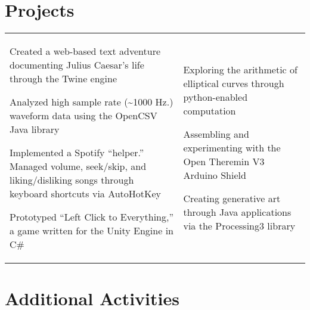 \documentclass[10.5pt, letterpaper]{article}
\begin{document}

\vspace{-24pt}
\section*{Projects}
\vspace{-8pt}

\begin{center}
	\begin{tabularx}{\textwidth}[t]{X X}
		
		\begin{description}
			\item [Prior Projects] 
				Created a web-based text adventure documenting Julius Caesar's life through the Twine engine
			\item Analyzed high sample rate (\~{}1000 Hz.) waveform data using the OpenCSV Java library
			\item Implemented a Spotify ``helper.'' Managed volume, seek/skip, and liking/disliking songs through keyboard shortcuts via AutoHotKey
			\item Prototyped ``Left Click to Everything,'' a game written for the Unity Engine in C\#
		\end{description}
		&
		
		\begin{description}
			\item [Current Projects] 
				Exploring the arithmetic of elliptical curves through python-enabled computation
			\item Assembling and experimenting with the Open Theremin V3 Arduino Shield
			\item Creating generative art through Java applications via the Processing3 library
		\end{description}
	\end{tabularx}
\end{center}

\vspace{-24pt}
\section*{Additional Activities}
\vspace{-18pt}
\end{document}
